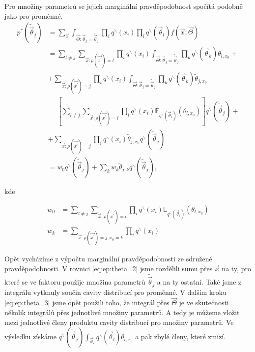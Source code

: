 Pro množiny parametrů se jejich marginální pravděpodobnost spočítá podobně jako
pro proměnné.
\begin{align}
p^*(\tilde{\vec{\theta}}_j) & = \sum_{\vec{x}} \int_{\vec{\Theta}:
    \vec{\theta}_j = \tilde{\vec{\theta}}_j} \prod_i q^\backslash(x_i) \prod_l
    q^\backslash(\vec{\theta}_l) f(\vec{x}; \vec{\Theta}) \label{eq:ep:theta_1}
\\
& = \sum_{l \ne j} \sum_{\vec{x}: \rho(\vec{x^\prime}) = l} \prod_i
    q^\backslash(x_i) \int_{\vec{\Theta}: \vec{\theta}_j =
    \tilde{\vec{\theta}}_j} \prod_k q^\backslash(\vec{\theta}_k) \theta_{l,
    x_0} + \label{eq:ep:theta_2}
\\
&   + \sum_{\vec{x}: \rho(\vec{x^\prime}) = j} \prod_i q^\backslash(x_i)
    \int_{\vec{\Theta}: \vec{\theta}_j = \tilde{\vec{\theta}}_j} \prod_k
    q^\backslash(\vec{\theta}_k) \tilde{\theta}_{j, x_0}
\nonumber
\\
& = \left[ \sum_{l \ne j} \sum_{\vec{x}: \rho(\vec{x^\prime}) = l} \prod_i
    q^\backslash(x_i) \mathbb{E}_{q^\backslash(\vec{\theta}_l)} (\theta_{l,
    x_0}) \right] q^\backslash(\tilde{\vec{\theta}}_j) + \label{eq:ep:theta_3}
\\
&   + \sum_{\vec{x}: \rho(\vec{x^\prime}) = j} \prod_i q^\backslash(x_i)
    \tilde{\theta}_{j,x_0} q^\backslash(\tilde{\vec{\theta}}_j)
\label{eq:ep:theta_4}
\nonumber
\\
& = w_0 q^\backslash(\tilde{\vec{\theta}}_j) + \sum_k w_k
    \tilde{\theta}_{j,k} q^\backslash(\tilde{\vec{\theta}}_j),
\end{align}

kde

\begin{align}
w_0 & = \sum_{l \ne j} \sum_{\vec{x}: \rho(\vec{x^\prime}) = l} \prod_i
    q^\backslash(x_i) \mathbb{E}_{q^\backslash(\vec{\theta}_l)} (\theta_{l,
    x_0}) \\
w_k & = \sum_{\vec{x}: \rho(\vec{x^\prime}) = j, x_0 = k} \prod_i
    q^\backslash(x_i)
\end{align}

Opět vycházíme z výpočtu marginální pravděpodobnosti ze sdružené
pravděpodobnosti. V rovnici \eqref{eq:ep:theta_2} jsme rozdělili sumu přes
$\vec{x}$ na ty, pro které se ve faktoru použije množina parametrů
$\tilde{\vec{\theta}}_j$ a na ty ostatní. Také jsme z integrálu vytknuly součin
cavity distribucí pro proměnné. V dalším kroku \eqref{eq:ep:theta_3} jsme opět
použili toho, že integrál přes $\vec{\Theta}$ je ve skutečnosti několik
integrálů přes jednotlivé množiny parametrů. A tedy je můžeme vložit mezi
jednotlivé členy produktu cavity distribucí pro množiny parametrů. Ve výsledku
získáme $q^\backslash(\tilde{\vec{\theta}}_j) \int_{\vec{\theta}_l}
q^\backslash(\vec{\theta}_l) \theta_{l, x_0}$ a pak zbylé členy, které zmizí.

